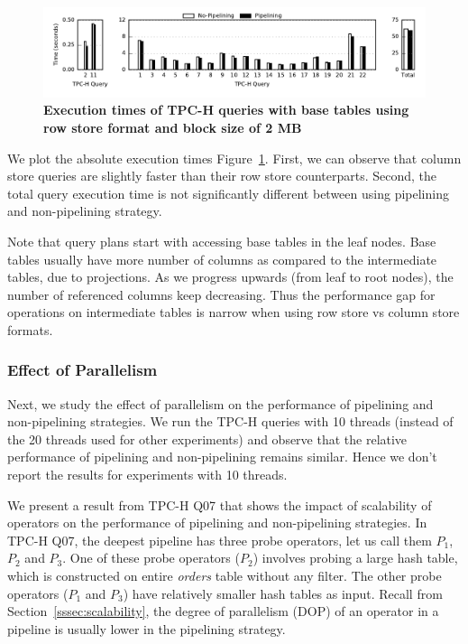 \begin{figure}
	\centering 
	\includegraphics[width=\textwidth]{pipeline/figures/rowstore-20threads-bs2mb-withlip-alltpch}
	\caption{\textbf{Execution times of TPC-H queries with base tables using row store format and block size of 2 MB}}
	\label{fig:absolute-times-all-tpch-bs2mb-20threads-rowstore}
\end{figure}

We plot the absolute execution times Figure~\ref{fig:absolute-times-all-tpch-bs2mb-20threads-rowstore}.
First, we can observe that column store queries are slightly faster than their row store counterparts. 
Second, the total query execution time is not significantly different between using pipelining and non-pipelining strategy. 

Note that query plans start with accessing base tables in the leaf nodes. 
Base tables usually have more number of columns as compared to the intermediate tables, due to projections.
As we progress upwards (from leaf to root nodes), the number of referenced columns keep decreasing. 
Thus the performance gap for operations on intermediate tables is narrow when using row store vs column store formats.

\subsubsection{Effect of Parallelism}\label{sssec:parallelism-effect}
Next, we study the effect of parallelism on the performance of pipelining and non-pipelining strategies. 
We run the TPC-H queries with 10 threads (instead of the 20 threads used for other experiments) and observe that the relative performance of pipelining and non-pipelining remains similar. 
Hence we don't report the results for experiments with 10 threads.

We present a result from TPC-H Q07 that shows the impact of scalability of operators on the performance of pipelining and non-pipelining strategies.
In TPC-H Q07, the deepest pipeline has three probe operators, let us call them $P_1$, $P_2$ and $P_3$.
One of these probe operators ($P_2$) involves probing a large hash table, which is constructed on entire \textit{orders} table without any filter.
The other probe operators ($P_1$ and $P_3$) have relatively smaller hash tables as input. 
Recall from Section~\ref{sssec:scalability}, the degree of parallelism (DOP) of an operator in a pipeline is usually lower in the pipelining strategy. %


